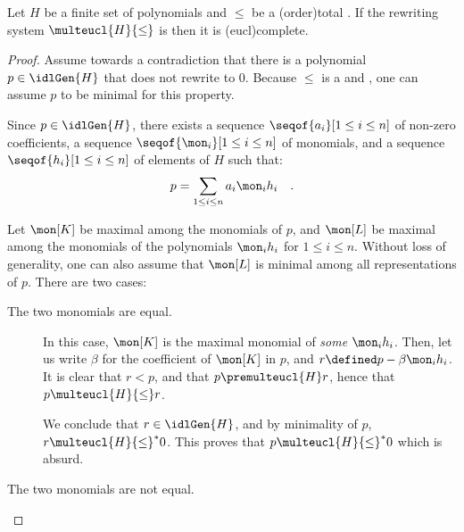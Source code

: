 \begin{lemma}
    \label{lem:confl-impl-complete}
    Let $H$ be a finite set of polynomials
    and $\leq$ be a  \kl(order){total}
    .
    If the rewriting system $\multeucl{H}{\leq}$ is 
    then it is \kl(eucl){complete}.
\end{lemma}
\begin{proof}
    Assume towards a contradiction that
    there is a polynomial $p \in \idlGen{H}$
    that does not rewrite to $0$.
    Because $\leq$ is a  and ,
    one can assume $p$ to be minimal for this property.

    Since $p \in \idlGen{H}$,
    there exists a sequence $\seqof{a_i}[1 \leq i \leq n]$
    of non-zero coefficients, 
    a sequence $\seqof{\mon_i}[1 \leq i \leq n]$
    of monomials,
    and a sequence 
    $\seqof{h_i}[1 \leq i \leq n]$ of elements of $H$
    such that:
    \begin{equation}
        p = \sum_{1 \leq i \leq n} a_i \mon_i h_i \quad .
    \end{equation}

    Let $\mon[K]$ be maximal among the monomials of $p$,
    and $\mon[L]$ be maximal among the monomials
    of the polynomials $\mon_i h_i$ for $1 \leq i \leq n$.
    Without loss of generality, one can also assume that 
    $\mon[L]$ is minimal among all representations of $p$.
    There are two cases:

    \begin{description}
        \item[The two monomials are equal.]
           In this case, $\mon[K]$ is the maximal monomial of
           \emph{some} $\mon_i h_i$.
           Then, let us write $\beta$ for the coefficient of
           $\mon[K]$ in $p$,
           and
           $r \defined p - \beta \mon_i h_i$.
           It is clear that 
           $r < p$, and that $p \premulteucl{H} r$,
           hence that 
           $p \multeucl{H}{\leq} r$.

           We conclude that $r \in \idlGen{H}$, 
           and by minimality of $p$, $r \multeucl{H}{\leq}^* 0$.
           This proves that 
           $p \multeucl{H}{\leq}^* 0$ 
           which is absurd.

        \item[The two monomials are not equal.]
            

\end{description}
\end{proof}
